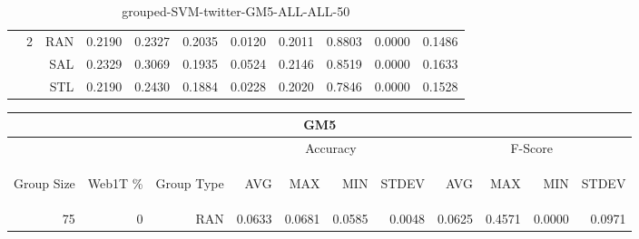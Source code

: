 \begin{center}
\begin{table}[htbp]
\begin{center}
\begin{tabular}{ | r | r | r | r | r | r | r | r | r | r | r |}
 & \multirow{3}{*}{2} & RAN & 0.2190 & 0.2327 & 0.2035 & 0.0120 & 0.2011 & 0.8803 & 0.0000 & 0.1486\\ \cline{3-11}
 &   & SAL & 0.2329 & 0.3069 & 0.1935 & 0.0524 & 0.2146 & 0.8519 & 0.0000 & 0.1633\\ \cline{3-11}
 &   & STL & 0.2190 & 0.2430 & 0.1884 & 0.0228 & 0.2020 & 0.7846 & 0.0000 & 0.1528\\ \cline{2-11}
\hline
\end{tabular}
\caption{grouped-SVM-twitter-GM5-ALL-ALL-50}
\end{center}
 \end{table}
\end{center}

\begin{center}
\begin{table}[htbp] 
 \begin{center}
\begin{tabular}{ | r | r | r | r | r | r | r | r | r | r | r |}
\hline
\multicolumn{11}{|c|}{GM5}\\
\hline
 & & & \multicolumn{4}{|c|}{Accuracy} & \multicolumn{4}{|c|}{F-Score}\\ \cline{4-11}
\begin{sideways}Group Size\end{sideways} & \begin{sideways}Web1T \%\end{sideways} & \begin{sideways}Group Type\end{sideways} & \begin{sideways}AVG\end{sideways} & \begin{sideways}MAX\end{sideways} & \begin{sideways}MIN\end{sideways} & \begin{sideways}STDEV\end{sideways} & \begin{sideways}AVG\end{sideways} & \begin{sideways}MAX\end{sideways} & \begin{sideways}MIN\end{sideways} & \begin{sideways}STDEV\end{sideways}\\
\hline
\multirow{9}{*}{75}
 & \multirow{3}{*}{0} & RAN & 0.0633 & 0.0681 & 0.0585 & 0.0048 & 0.0625 & 0.4571 & 0.0000 & 0.0971\\ \cline{3-11}

\end{tabular}
\end{center}
\end{table}
\end{center}
